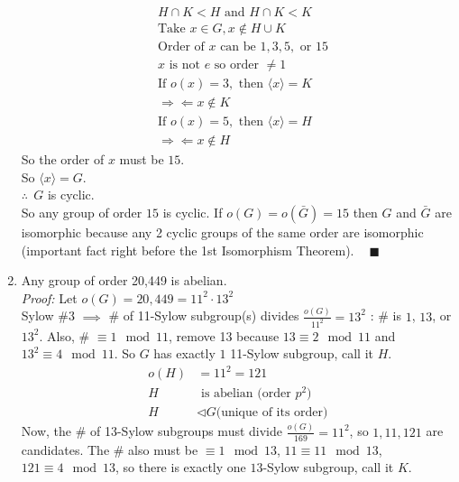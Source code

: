 \begin{enumerate}
    \begin{align}
        &H\cap K < H \text{ and } H\cap K < K \nonumber \\
        &\text{Take }x\in G, x\not\in H\cup K \nonumber \\
        &\text{Order of }x \text{ can be }1, 3, 5,\text{ or }15 \nonumber\\
        &x\text{ is not } e \text{ so order }\neq 1 \nonumber \\
        &\text{If }o(x)=3, \text{ then } \langle x \rangle = K \nonumber \\
        &\Rightarrow\Leftarrow x \not \in K \nonumber \\
        &\text{If }o(x)=5, \text{ then } \langle x\rangle = H \nonumber \\
        &\Rightarrow\Leftarrow x\not \in H \nonumber
    \end{align}
    So the order of $x$ must be $15$. \steezybreak\\
    So $\langle x \rangle = G$. \steezybreak\\
    $\therefore \ \ G$ is cyclic. \\
    So any group of order $15$ is cyclic. If $o(G)=o(\bar{G})=15$ then $G$ and $\bar{G}$ are isomorphic because any 2 cyclic groups of the same order are isomorphic (important fact right before the 1st Isomorphism Theorem). $\ \ \ \ \blacksquare$
    \item Any group of order 20,449 is abelian. \steezybreak\\
    \noindent \textit{Proof:} Let $o(G)=20,449=11^2\cdot 13^2$ \steezybreak\\
    Sylow \#3 $\implies$ \# of 11-Sylow subgroup(s) divides $\frac{o(G)}{11^2}=13^2$ : \# is $1$, $13$, or $13^2$. Also, \# $\equiv 1 \mod 11$, remove 13 because $13\equiv 2\mod 11$ and $13^2\equiv 4\mod 11$. So $G$ has exactly $1$ 11-Sylow subgroup, call it $H$. \steezybreak\\
    \begin{align}
        o(H)&=11^2=121 \nonumber \\
        H &\text{ is abelian (order }p^2) \nonumber \\
        H&\triangleleft G \text{(unique of its order)} \nonumber
    \end{align}
    Now, the \# of 13-Sylow subgroups must divide $\frac{o(G)}{169}=11^2$, so $1, 11, 121$ are candidates. The \# also must be $\equiv 1 \mod 13$, $11\equiv 11\mod 13$, $121 \equiv 4 \mod 13$, so there is exactly one $13$-Sylow subgroup, call it $K$.
    \begin{align}

\end{align}
\end{enumerate}
